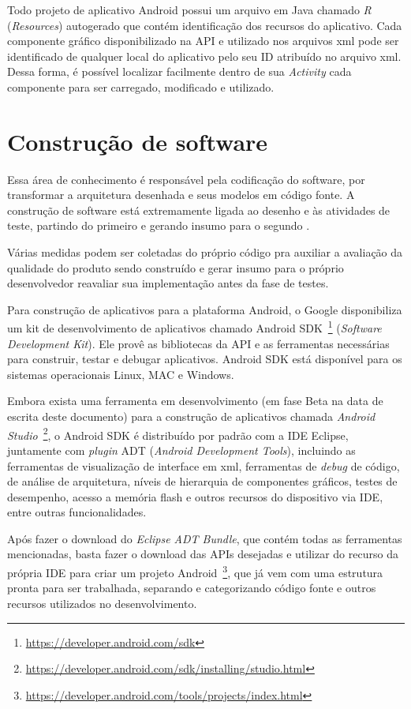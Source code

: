 Todo projeto de aplicativo Android possui um arquivo em Java chamado \textit{R} (\textit{Resources}) autogerado que contém identificação dos recursos do aplicativo. Cada componente gráfico disponibilizado na API e utilizado nos arquivos xml pode ser identificado de qualquer local do aplicativo pelo seu ID atribuído no arquivo xml. Dessa forma, é possível localizar facilmente dentro de sua \textit{Activity} cada componente para ser carregado, modificado e utilizado.

\section{Construção de software}

Essa área de conhecimento é responsável pela codificação do software, por transformar a arquitetura desenhada e seus modelos em código fonte. A construção de software está extremamente ligada ao desenho e às atividades de teste, partindo do primeiro e gerando insumo para o segundo \cite{swebok}.

Várias medidas podem ser coletadas do próprio código pra auxiliar a avaliação da qualidade do produto sendo construído e gerar insumo para o próprio desenvolvedor reavaliar sua implementação antes da fase de testes.

Para construção de aplicativos para a plataforma Android, o Google disponibiliza um kit de desenvolvimento de aplicativos chamado Android SDK~\footnote{\url{https://developer.android.com/sdk}} (\textit{Software Development Kit}). Ele provê as bibliotecas da API e as ferramentas necessárias para construir, testar e debugar aplicativos. Android SDK está disponível para os sistemas operacionais Linux, MAC e Windows.

Embora exista uma ferramenta em desenvolvimento (em fase Beta na data de escrita deste documento) para a construção de aplicativos chamada \textit{Android Studio}~\footnote{\url{https://developer.android.com/sdk/installing/studio.html}}, o Android SDK é distribuído por padrão com a IDE Eclipse, juntamente com \textit{plugin} ADT (\textit{Android Development Tools}), incluindo as ferramentas de visualização de interface em xml, ferramentas de \textit{debug} de código, de análise de arquitetura, níveis de hierarquia de componentes gráficos, testes de desempenho, acesso a memória flash e outros recursos do dispositivo via IDE, entre outras funcionalidades.

Após fazer o download do \textit{Eclipse ADT Bundle}, que contém todas as ferramentas mencionadas, basta fazer o download das APIs desejadas e utilizar do recurso da própria IDE para criar um projeto Android~\footnote{\url{https://developer.android.com/tools/projects/index.html}}, que já vem com uma estrutura pronta para ser trabalhada, separando e categorizando código fonte e outros recursos utilizados no desenvolvimento.


